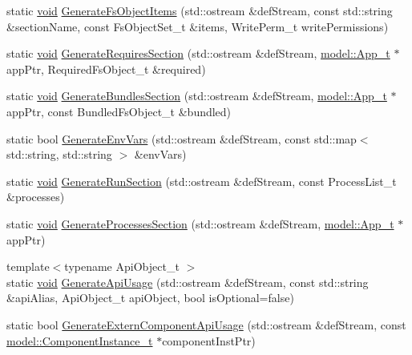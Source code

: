 \begin{DoxyCompactItemize}
static \hyperlink{_t_e_m_p_l_a_t_e__cdef_8h_ac9c84fa68bbad002983e35ce3663c686}{void} \hyperlink{namespaceadef_gen_acfc67ad4bf9739bbaa8c230ce32dcb1a}{Generate\+Fs\+Object\+Items} (std\+::ostream \&def\+Stream, const std\+::string \&section\+Name, const Fs\+Object\+Set\+\_\+t \&items, Write\+Perm\+\_\+t write\+Permissions)
\item 
static \hyperlink{_t_e_m_p_l_a_t_e__cdef_8h_ac9c84fa68bbad002983e35ce3663c686}{void} \hyperlink{namespaceadef_gen_afb1a3092be3655cd9edeb2ad3383a405}{Generate\+Requires\+Section} (std\+::ostream \&def\+Stream, \hyperlink{structmodel_1_1_app__t}{model\+::\+App\+\_\+t} $\ast$app\+Ptr, Required\+Fs\+Object\+\_\+t \&required)
\item 
static \hyperlink{_t_e_m_p_l_a_t_e__cdef_8h_ac9c84fa68bbad002983e35ce3663c686}{void} \hyperlink{namespaceadef_gen_a18f1abae3c0b83c902d721982ca55f3f}{Generate\+Bundles\+Section} (std\+::ostream \&def\+Stream, \hyperlink{structmodel_1_1_app__t}{model\+::\+App\+\_\+t} $\ast$app\+Ptr, const Bundled\+Fs\+Object\+\_\+t \&bundled)
\item 
static bool \hyperlink{namespaceadef_gen_a16220f1115acaddf99e529535c32fbda}{Generate\+Env\+Vars} (std\+::ostream \&def\+Stream, const std\+::map$<$ std\+::string, std\+::string $>$ \&env\+Vars)
\item 
static \hyperlink{_t_e_m_p_l_a_t_e__cdef_8h_ac9c84fa68bbad002983e35ce3663c686}{void} \hyperlink{namespaceadef_gen_a2b12970ebc424fb97aa1951464f7759b}{Generate\+Run\+Section} (std\+::ostream \&def\+Stream, const Process\+List\+\_\+t \&processes)
\item 
static \hyperlink{_t_e_m_p_l_a_t_e__cdef_8h_ac9c84fa68bbad002983e35ce3663c686}{void} \hyperlink{namespaceadef_gen_a5b6880ff14a0649b0519fe82c99fad77}{Generate\+Processes\+Section} (std\+::ostream \&def\+Stream, \hyperlink{structmodel_1_1_app__t}{model\+::\+App\+\_\+t} $\ast$app\+Ptr)
\item 
{\footnotesize template$<$typename Api\+Object\+\_\+t $>$ }\\static \hyperlink{_t_e_m_p_l_a_t_e__cdef_8h_ac9c84fa68bbad002983e35ce3663c686}{void} \hyperlink{namespaceadef_gen_aa41f970df9868c20bf429b04d0a6b172}{Generate\+Api\+Usage} (std\+::ostream \&def\+Stream, const std\+::string \&api\+Alias, Api\+Object\+\_\+t api\+Object, bool is\+Optional=false)
\item 
static bool \hyperlink{namespaceadef_gen_ab6fa4ce25d894f86b652d7d26f2173dc}{Generate\+Extern\+Component\+Api\+Usage} (std\+::ostream \&def\+Stream, const \hyperlink{structmodel_1_1_component_instance__t}{model\+::\+Component\+Instance\+\_\+t} $\ast$component\+Inst\+Ptr)

\end{DoxyCompactItemize}

